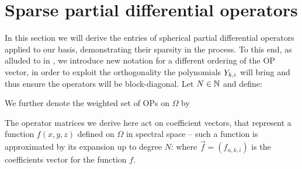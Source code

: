 %
\section{Sparse partial differential operators}\label{Section:sc:PDOs}

In this section we will derive the entries of spherical partial differential operators applied to our basis, demonstrating their sparsity in the process. To this end, as alluded to in , we introduce new notation for a different ordering of the OP vector, in order to exploit the orthogonality the polynomials $Y_{k,i}$ will bring and thus ensure the operators will be block-diagonal. Let $N \in \mathbb{N}$ and define:

We further denote the weighted set of OPs on $\Omega$ by 

The operator matrices we derive here act on coefficient vectors, that represent a function $f(x,y,z)$ defined on $\Omega$ in spectral space -- such a function is approximated by its expansion up to degree $N$: 
where $\vec f = (f_{n,k,i})$ is the coefficients vector for the function $f$.

